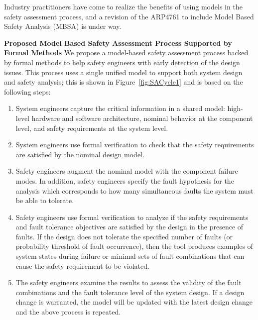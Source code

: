 Industry practitioners have come to realize the benefits of using models in the safety assessment process, and a revision of the ARP4761 to include Model Based Safety Analysis (MBSA) is under way. 

\textbf{Proposed Model Based Safety Assessment Process Supported by Formal Methods}
We propose a model-based safety assessment process backed by formal methods to help safety engineers with early detection of the design issues.  This process uses a single unified model to support both system design and safety analysis; this is shown in Figure~\ref{fig:SACycle1} and is based on the following steps:

\begin{enumerate}
	\item System engineers capture the critical information in a shared model:  high-level hardware and software architecture, nominal behavior at the component level, and safety requirements at the system level.
	\item System engineers use formal verification to check that the safety requirements are satisfied by the nominal design model. 
	\item Safety engineers augment the nominal model with the component failure modes. In addition, safety engineers specify the fault hypothesis for the analysis which corresponds to how many simultaneous faults the system must be able to tolerate.
	\item Safety engineers use formal verification to analyze if the safety requirements and fault tolerance objectives are satisfied by the design in the presence of faults. If the design does not tolerate the specified number of faults (or probability threshold of fault occurrence), then the tool produces examples of system states during failure or minimal sets of fault combinations that can cause the safety requirement to be violated.
	\item The safety engineers examine the results to assess the validity of the fault combinations and the fault tolerance level of the system design. If a design change is warranted, the model will be updated with the latest design change and the above process is repeated.
\end{enumerate}

